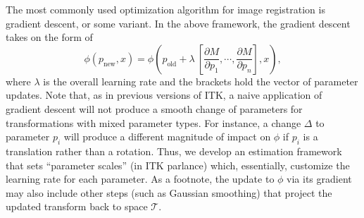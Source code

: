 \documentclass{llncs}
\begin{document}
The most commonly used optimization algorithm for image registration
is gradient descent, or some variant.   In the above framework, the
gradient descent takes on the form of
$$
\phi(p_\text{new},x)=\phi(p_\text{old}+\lambda~[ \frac{\partial
  M}{\partial p_1} , \cdots , \frac{\partial
  M}{\partial p_n} ] ,  x ),
$$
where $\lambda$ is the overall learning rate and the brackets hold the
vector of parameter updates.  Note that, as in previous versions of
ITK, a naive application of gradient descent will not produce a smooth
change of parameters for transformations with mixed parameter types.
For instance, a change $\Delta$ to parameter $p_i$ will produce a
different magnitude of impact on $\phi$ if $p_i$ is a translation rather than a
rotation.  Thus, we develop an estimation framework that sets
``parameter scales'' (in ITK parlance) which, essentially, customize
the learning rate for each parameter.  As a footnote, the update to
$\phi$ via its gradient may also include other steps (such as Gaussian
smoothing) that project the updated transform back to space $\mathcal{T}$.

\end{document}
